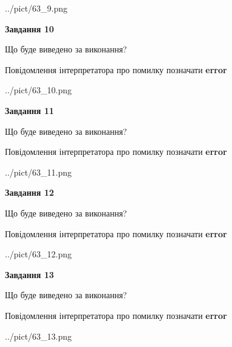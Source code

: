 \documentclass[11pt, ukrainian]{article}
\begin{document}
{\begin {large}
\begin{center}
	{../pict/63_9.png}
\end{center}
\newpage

{\begin {center}\textbf{Завдання 10}\end {center}}\par
Що буде виведено за виконання? \par
Повідомлення інтерпретатора про помилку позначати \textbf{error}

\begin{center}
	{../pict/63_10.png}
\end{center}
\newpage

{\begin {center}\textbf{Завдання 11}\end {center}}\par
Що буде виведено за виконання? \par
Повідомлення інтерпретатора про помилку позначати \textbf{error}

\begin{center}
	{../pict/63_11.png}
\end{center}
\newpage

{\begin {center}\textbf{Завдання 12}\end {center}}\par
Що буде виведено за виконання? \par
Повідомлення інтерпретатора про помилку позначати \textbf{error}

\begin{center}
	{../pict/63_12.png}
\end{center}
\newpage

{\begin {center}\textbf{Завдання 13}\end {center}}\par
Що буде виведено за виконання? \par
Повідомлення інтерпретатора про помилку позначати \textbf{error}

\begin{center}
	{../pict/63_13.png}
\end{center}
\newpage


\end{large}}
\end{document}
